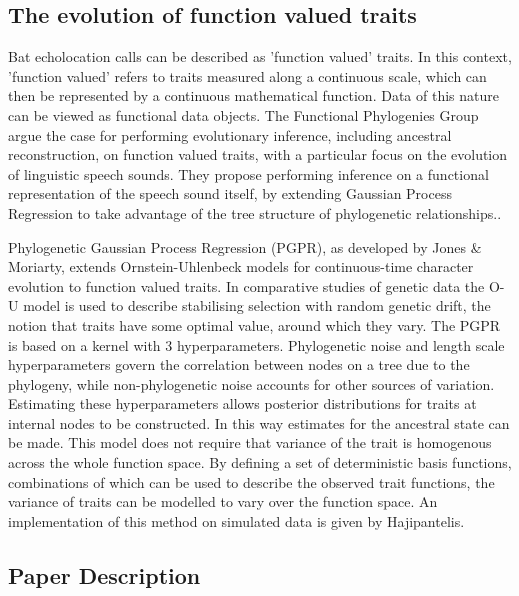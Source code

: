 \documentclass[wsdraft]{ws-rv9x6} %
\begin{document}
\subsection{The evolution of function valued traits}

Bat echolocation calls can be described as 'function valued' traits.\cite{meyer2005up} In this context, 'function valued' refers to traits measured along a continuous scale, which can then be represented by a continuous mathematical function. Data of this nature can be viewed as functional data objects.\cite{ramsay2006functional} The Functional Phylogenies Group\cite{group2012phylogenetic} argue the case for performing evolutionary inference, including ancestral reconstruction, on function valued traits, with a particular focus on the evolution of linguistic speech sounds. They propose performing inference on a functional representation of the speech sound itself, by extending Gaussian Process Regression\cite{rasmussen2006gaussian} to take advantage of the tree structure of phylogenetic relationships.\cite{jones2013evolutionary}. 

Phylogenetic Gaussian Process Regression (PGPR), as developed by Jones \& Moriarty,\cite{jones2013evolutionary} extends Ornstein-Uhlenbeck\cite{uhlenbeck1930theory} models for continuous-time character evolution to function valued traits. In comparative studies of genetic data the O-U model is used to describe stabilising selection with random genetic drift, the notion that traits have some optimal value, around which they vary.\cite{hansen1997stabilizing} The PGPR is based on a kernel with 3 hyperparameters. Phylogenetic noise and length scale hyperparameters govern the correlation between nodes on a tree due to the phylogeny, while non-phylogenetic noise accounts for other sources of variation. Estimating these hyperparameters allows posterior distributions for traits at internal nodes to be constructed. In this way estimates for the ancestral state can be made. This model does not require that variance of the trait is homogenous across the whole function space. By defining a set of deterministic basis functions, combinations of which can be used to describe the observed trait functions, the variance of traits can be modelled to vary over the function space. An implementation of this method on simulated data is given by Hajipantelis.\cite{hadjipantelis2013function} 

\subsection{Paper Description}
\end{document}
